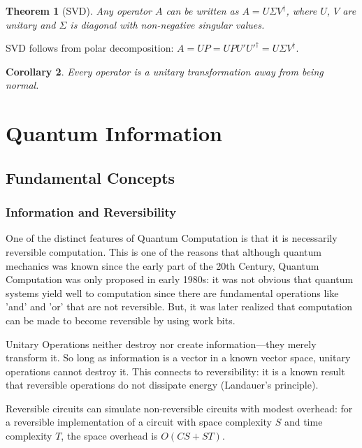 \documentclass[12pt, a4paper, oneside]{report}
\theoremstyle{plain}
\newtheorem{theorem}{Theorem}[chapter]
\newtheorem{corollary}[theorem]{Corollary}
\theoremstyle{definition}
\theoremstyle{remark}
\begin{document}
\begin{theorem}[SVD]
	Any operator $A$ can be written as $A = U\Sigma V^\dagger$, where $U$, $V$ are unitary
	and $\Sigma$ is diagonal with non-negative singular values.
\end{theorem}

SVD follows from polar decomposition: $A = UP = UPU'U'^\dagger = U\Sigma V^\dagger$.

\begin{corollary}
	Every operator is a unitary transformation away from being normal.
\end{corollary}







\chapter{Quantum Information}

\section{Fundamental Concepts}
\label{sec:fundamental}

\subsection{Information and Reversibility}

One of the distinct features of Quantum Computation is that it is necessarily reversible computation. This is one of the reasons that although quantum mechanics was known since the early part of the 20th Century, Quantum Computation was only proposed in early 1980s: it was not obvious that quantum systems yield well to computation since there are fundamental operations like 'and' and 'or' that are not reversible. But, it was later realized that computation can be made to become reversible by using work bits.

Unitary Operations neither destroy nor create information---they merely transform it. So long as
information is a vector in a known vector space, unitary operations cannot destroy it.
This connects to reversibility: it is a known result that reversible operations do not dissipate energy (Landauer's
principle).

Reversible circuits can simulate non-reversible circuits with modest overhead:
for a reversible implementation of a circuit with space complexity $S$ and time complexity
$T$, the space overhead is $O(CS + ST)$.
\end{document}
